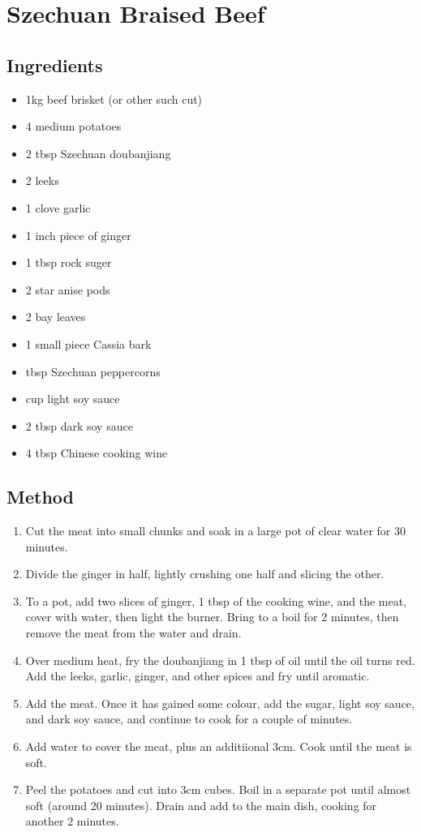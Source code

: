 \section{Szechuan Braised Beef}


\subsection{Ingredients}

\begin{itemize}
  \item 1kg beef brisket (or other such cut)
  \item 4 medium potatoes
  \item 2 tbsp Szechuan doubanjiang
  \item 2 leeks
  \item 1 clove garlic
  \item 1 inch piece of ginger
  \item 1 tbsp rock suger
  \item 2 star anise pods
  \item 2 bay leaves
  \item 1 small piece Cassia bark
  \item {} tbsp Szechuan peppercorns
  \item {} cup light soy sauce
  \item 2 tbsp dark soy sauce
  \item 4 tbsp Chinese cooking wine
\end{itemize}

\subsection{Method}

\begin{enumerate}
  \item Cut the meat into small chunks and soak in a large pot of clear water for 30 minutes.
  \item Divide the ginger in half, lightly crushing one half and slicing the other.
  \item To a pot, add two slices of ginger, 1 tbsp of the cooking wine, and the meat, cover with water, then light the burner. Bring to a boil for 2 minutes, then remove the meat from the water and drain.
  \item Over medium heat, fry the doubanjiang in 1 tbsp of oil until the oil turns red. Add the leeks, garlic, ginger, and other spices and fry until aromatic.
  \item Add the meat. Once it has gained some colour, add the sugar, light soy sauce, and dark soy sauce, and continue to cook for a couple of minutes.
  \item Add water to cover the meat, plus an additiional 3cm. Cook until the meat is soft.
  \item Peel the potatoes and cut into 3cm cubes. Boil in a separate pot until almost soft (around 20 minutes). Drain and add to the main dish, cooking for another 2 minutes.
\end{enumerate}

